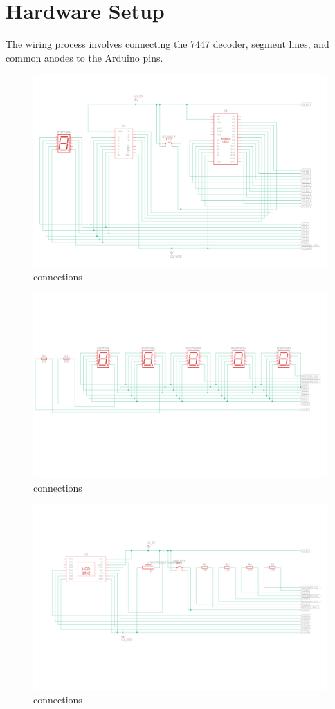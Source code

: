 \documentclass[journal]{IEEEtran}
\numberwithin{equation}{enumi}
\numberwithin{figure}{enumi}
\begin{document}
\section{Hardware Setup}
The wiring process involves connecting the 7447 decoder, segment lines, and common anodes to the Arduino pins.
\begin{figure}[H]
    \centering
    \includegraphics[width=0.9\linewidth]{figs/Pinout1.png}
    \caption{connections}
    \label{fig:enter-label}
\end{figure}
\begin{figure}
    \centering
    \includegraphics[width=0.9\linewidth]{figs/Pinout2.png}
    \caption{connections}
    \label{fig:enter-label}
\end{figure}
\begin{figure}
    \centering
    \includegraphics[width=0.9\linewidth]{figs/Pinout3.png}
    \caption{connections}
    \label{fig:enter-label}
\end{figure}
\newpage
\end{document}
